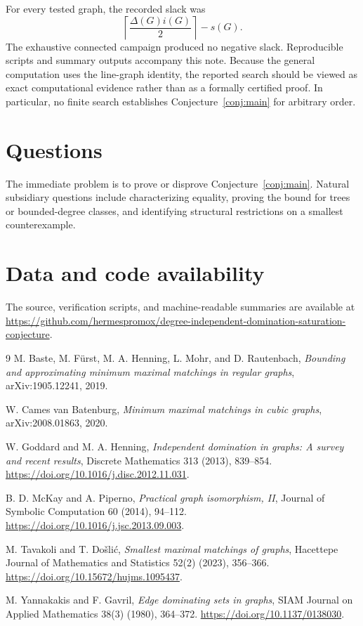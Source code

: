 \documentclass[11pt]{article}
\newcommand{\sat}{s}
\begin{document}
For every tested graph, the recorded slack was
\[
 \left\lceil\frac{\Delta(G)i(G)}2\right\rceil-\sat(G).
\]
The exhaustive connected campaign produced no negative slack. Reproducible scripts and summary outputs accompany this note. Because the general computation uses the line-graph identity, the reported search should be viewed as exact computational evidence rather than as a formally certified proof. In particular, no finite search establishes Conjecture~\ref{conj:main} for arbitrary order.

\section{Questions}
The immediate problem is to prove or disprove Conjecture~\ref{conj:main}. Natural subsidiary questions include characterizing equality, proving the bound for trees or bounded-degree classes, and identifying structural restrictions on a smallest counterexample.

\section*{Data and code availability}
The source, verification scripts, and machine-readable summaries are available at
\url{https://github.com/hermespromox/degree-independent-domination-saturation-conjecture}.

\begin{thebibliography}{9}
M. Baste, M. F\"urst, M. A. Henning, L. Mohr, and D. Rautenbach,
\emph{Bounding and approximating minimum maximal matchings in regular graphs},
arXiv:1905.12241, 2019.

W. Cames van Batenburg,
\emph{Minimum maximal matchings in cubic graphs},
arXiv:2008.01863, 2020.

W. Goddard and M. A. Henning,
\emph{Independent domination in graphs: A survey and recent results},
Discrete Mathematics 313 (2013), 839--854.
\url{https://doi.org/10.1016/j.disc.2012.11.031}.

B. D. McKay and A. Piperno,
\emph{Practical graph isomorphism, II},
Journal of Symbolic Computation 60 (2014), 94--112.
\url{https://doi.org/10.1016/j.jsc.2013.09.003}.

M. Tavakoli and T. Do\v{s}li\'c,
\emph{Smallest maximal matchings of graphs},
Hacettepe Journal of Mathematics and Statistics 52(2) (2023), 356--366.
\url{https://doi.org/10.15672/hujms.1095437}.

M. Yannakakis and F. Gavril,
\emph{Edge dominating sets in graphs},
SIAM Journal on Applied Mathematics 38(3) (1980), 364--372.
\url{https://doi.org/10.1137/0138030}.
\end{thebibliography}
\end{document}
